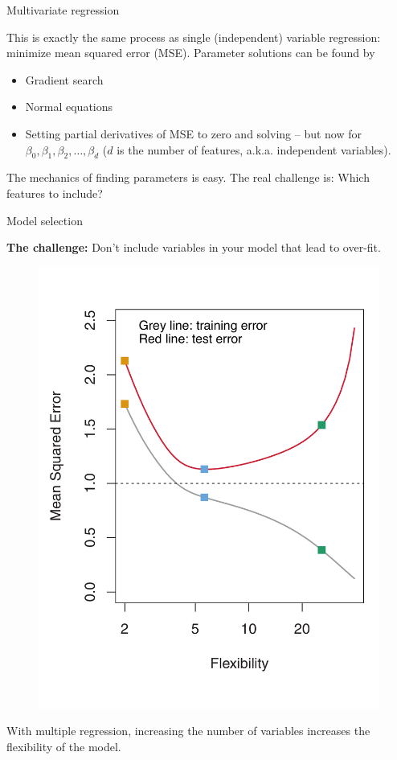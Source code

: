 \documentclass[aspectratio=169, handout]{beamer}
\begin{document}
\begin{frame}{Multivariate regression}

This is exactly the same process as single (independent) variable regression: minimize mean squared error (MSE).  Parameter solutions can be found by
\begin{itemize}
\item Gradient search
\item Normal equations
\item Setting partial derivatives of MSE to zero and solving -- but now for $\beta_0, \beta_1, \beta_2,\ldots,\beta_d$ ($d$ is the number of features, a.k.a. independent variables).
\end{itemize}

\vspace{5mm}
The mechanics of finding parameters is easy.  The real challenge is: Which features to include?
\end{frame}

\begin{frame}{Model selection}

\textbf{The challenge:} Don't include variables in your model that lead to over-fit.

\vspace{-5mm}

\begin{figure}
\includegraphics[height=0.8\textheight]{islr2_9b}
\end{figure}

\vspace{-10mm}
With multiple regression, increasing the number of variables increases the flexibility of the model.

\end{frame}
\end{document}
